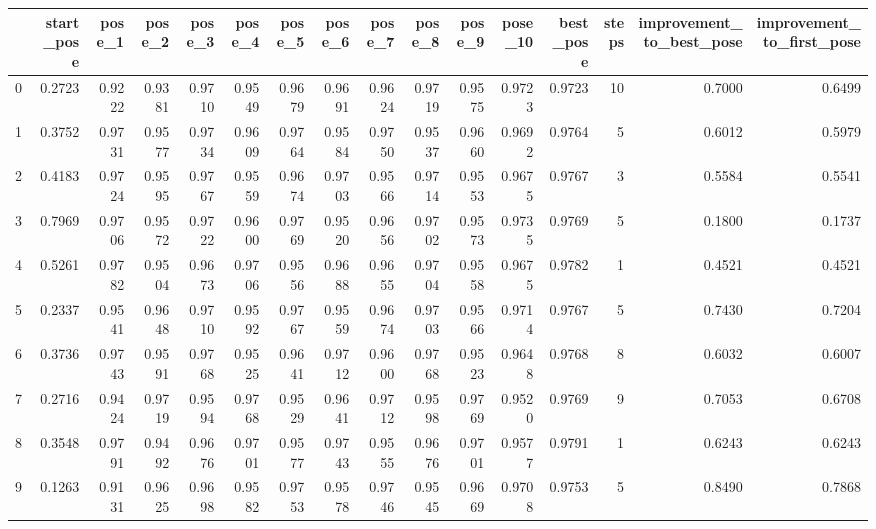 \begin{tabular}{lrrrrrrrrrrrrrrr}
\toprule
{} &  start\_pose &  pose\_1 &  pose\_2 &  pose\_3 &  pose\_4 &  pose\_5 &  pose\_6 &  pose\_7 &  pose\_8 &  pose\_9 &  pose\_10 &  best\_pose &  steps &  improvement\_to\_best\_pose &  improvement\_to\_first\_pose \\
\midrule
0   &      0.2723 &  0.9222 &  0.9381 &  0.9710 &  0.9549 &  0.9679 &  0.9691 &  0.9624 &  0.9719 &  0.9575 &   0.9723 &     0.9723 &     10 &                    0.7000 &                     0.6499 \\
1   &      0.3752 &  0.9731 &  0.9577 &  0.9734 &  0.9609 &  0.9764 &  0.9584 &  0.9750 &  0.9537 &  0.9660 &   0.9692 &     0.9764 &      5 &                    0.6012 &                     0.5979 \\
2   &      0.4183 &  0.9724 &  0.9595 &  0.9767 &  0.9559 &  0.9674 &  0.9703 &  0.9566 &  0.9714 &  0.9553 &   0.9675 &     0.9767 &      3 &                    0.5584 &                     0.5541 \\
3   &      0.7969 &  0.9706 &  0.9572 &  0.9722 &  0.9600 &  0.9769 &  0.9520 &  0.9656 &  0.9702 &  0.9573 &   0.9735 &     0.9769 &      5 &                    0.1800 &                     0.1737 \\
4   &      0.5261 &  0.9782 &  0.9504 &  0.9673 &  0.9706 &  0.9556 &  0.9688 &  0.9655 &  0.9704 &  0.9558 &   0.9675 &     0.9782 &      1 &                    0.4521 &                     0.4521 \\
5   &      0.2337 &  0.9541 &  0.9648 &  0.9710 &  0.9592 &  0.9767 &  0.9559 &  0.9674 &  0.9703 &  0.9566 &   0.9714 &     0.9767 &      5 &                    0.7430 &                     0.7204 \\
6   &      0.3736 &  0.9743 &  0.9591 &  0.9768 &  0.9525 &  0.9641 &  0.9712 &  0.9600 &  0.9768 &  0.9523 &   0.9648 &     0.9768 &      8 &                    0.6032 &                     0.6007 \\
7   &      0.2716 &  0.9424 &  0.9719 &  0.9594 &  0.9768 &  0.9529 &  0.9641 &  0.9712 &  0.9598 &  0.9769 &   0.9520 &     0.9769 &      9 &                    0.7053 &                     0.6708 \\
8   &      0.3548 &  0.9791 &  0.9492 &  0.9676 &  0.9701 &  0.9577 &  0.9743 &  0.9555 &  0.9676 &  0.9701 &   0.9577 &     0.9791 &      1 &                    0.6243 &                     0.6243 \\
9   &      0.1263 &  0.9131 &  0.9625 &  0.9698 &  0.9582 &  0.9753 &  0.9578 &  0.9746 &  0.9545 &  0.9669 &   0.9708 &     0.9753 &      5 &                    0.8490 &                     0.7868 \\

\end{tabular}
